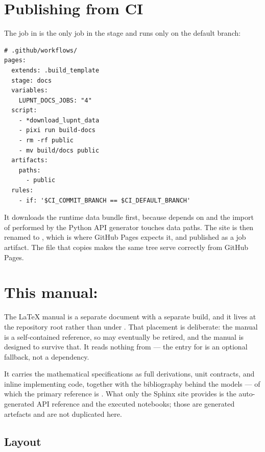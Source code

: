 \section{Publishing from CI}
\label{sec:bd-ci}

The  job in  is the only job in the
 stage and runs only on the default branch:

\begin{lstlisting}[language=yamlcfg]
# .github/workflows/
pages:
  extends: .build_template
  stage: docs
  variables:
    LUPNT_DOCS_JOBS: "4"
  script:
    - *download_lupnt_data
    - pixi run build-docs
    - rm -rf public
    - mv build/docs public
  artifacts:
    paths:
      - public
  rules:
    - if: '$CI_COMMIT_BRANCH == $CI_DEFAULT_BRANCH'
\end{lstlisting}

It downloads the runtime data bundle first, because  depends
on  and the import of \pylupnt{} performed by the Python API
generator touches data paths. The site is then renamed to , which
is where GitHub Pages expects it, and published as a job artifact. The
 file that  copies makes the same tree
serve correctly from GitHub Pages.

\section{This manual: }
\label{sec:bd-latex}

The LaTeX manual is a separate document with a separate build, and it lives at
the repository root rather than under . That placement is
deliberate: the manual is a self-contained reference, so  may
eventually be retired, and the manual is designed to survive that. It reads nothing from  --- the
 entry for  is an optional
fallback, not a dependency.

It carries the mathematical specifications as full derivations, unit contracts,
and inline implementing code, together with the bibliography behind the models
--- of which the primary reference is \citep{iiyama2026thesis}. What only the
Sphinx site provides is the auto-generated API reference and the executed
notebooks; those are generated artefacts and are not duplicated here.

\subsection{Layout}

